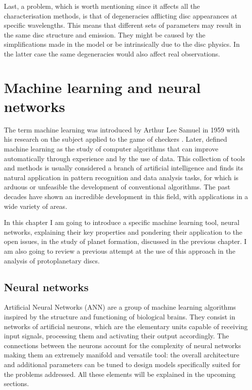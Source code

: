 \documentclass[a4paper,10pt]{report}
\begin{document}
Last, a problem, which is worth mentioning since it affects all the characterisation methods,
is that of degeneracies afflicting disc appearances at specific
wavelengths. This means that different sets of parameters may result in the same disc structure and emission.
They might be caused by the simplifications made in the model or be intrinsically due to the disc physics. 
In the latter case the same degeneracies would also affect real observations.

\chapter{Machine learning and neural networks}

The term machine learning was introduced by Arthur Lee Samuel in 1959
with his research on the subject applied to the game of checkers \citep{ml_checkers}. Later, 
\citet{book_ml} defined machine learning as the study of
computer algorithms that can improve automatically through experience and by the use of data.
This collection of tools and methods is usually considered a branch of artificial intelligence and 
finds its natural application in pattern recognition and data analysis tasks, for which is arduous or
unfeasible the development of conventional algorithms.
The past decades have shown an incredible development in this field,
with applications in a wide variety of areas.

In this chapter I am going to introduce a specific machine learning tool, neural networks, explaining
their key properties and pondering their application to the open issues, in the study of planet formation,
discussed in the previous chapter. I am also going to review a previous attempt at the use of this approach in the 
analysis of protoplanetary discs.

\section{Neural networks}

Artificial Neural Networks (ANN) are a group of machine learning algorithms inspired by the structure and functioning 
of biological brains.
They consist in networks of artificial neurons,
which are the elementary units capable of receiving input signals, processing
them and activating their output accordingly. The connections between the neurons account for 
the complexity of neural networks making them an extremely manifold and versatile tool:
the overall architecture and additional parameters can be tuned to design 
models specifically suited for the problems addressed.
All these elements will be explained in the upcoming sections.
\end{document}

